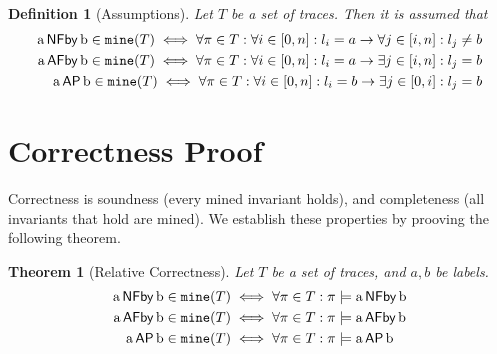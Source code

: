 \documentclass[a4paper,10pt]{scrartcl}
\newtheorem{definition}{Definition}
\newtheorem{theorem}{Theorem}
\newcommand{\NFBy}[2]{\ensuremath{\textup{{#1}\,\textsf{NFby}\,{#2}}}}
\newcommand{\AFBy}[2]{\ensuremath{\textup{{#1}\,\textsf{AFby}\,{#2}}}}
\newcommand{\AP}[2]{\ensuremath{\textup{{#1}\,\textsf{AP}\,{#2}}}}
\newcommand{\mine}{\ensuremath{\textup{\texttt{mine}}}}
\newcommand{\impl}{\ensuremath{\rightarrow}}
\begin{document}
\begin{definition}[Assumptions]
Let $T$ be a set of traces. Then it is assumed that
\begin{align*}
 \NFBy{a}{b}\in\mine(T)\iff\forall \pi\in{T}:\forall{i}\in[0,n]:l_i=a\impl\forall{}j\in[i,n]:l_j\not=b\\
 \AFBy{a}{b}\in\mine(T)\iff\forall \pi\in{T}:\forall{i}\in[0,n]:l_i=a\impl\exists{}j\in[i,n]:l_j=b\\
 \AP{a}{b}\in\mine(T)\iff\forall \pi\in{T}:\forall{i}\in[0,n]:l_i=b\impl\exists{}j\in[0,i]:l_j=b
\end{align*}
\label{ass}
\end{definition}

\section{Correctness Proof}
Correctness is soundness (every mined invariant holds), and completeness (all invariants that hold are mined). We establish these properties by prooving
the following theorem.
\begin{theorem}[Relative Correctness]
Let $T$ be a set of traces, and $a,b$ be labels.
\begin{align*}
 \NFBy{a}{b}\in\mine(T)&\iff\forall \pi\in{T}: \pi\models\NFBy{a}{b}\\
 \AFBy{a}{b}\in\mine(T)&\iff\forall \pi\in{T}: \pi\models\AFBy{a}{b}\\
 \AP{a}{b}\in\mine(T)&\iff\forall \pi\in{T}: \pi\models\AP{a}{b}
\end{align*}
\end{theorem}
\end{document}
